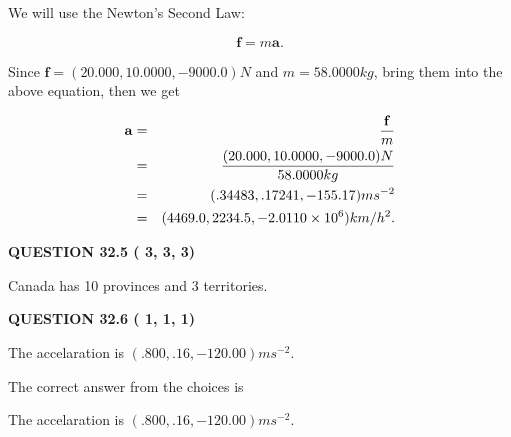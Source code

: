 \documentclass[12pt]{article}
\begin{document}
We will use the Newton's Second Law:
 
\[
\mathbf{f}=m\mathbf{a}.
\]
 
Since $\mathbf{f}=( %
20.000,  %
10.0000,  %
-9000.0 )N$
and $m= %
58.0000kg$, bring them into the above equation, then we get
 
\begin{eqnarray*}
\mathbf{a}&=&\frac{\mathbf{f}}m  \\
&=&\frac{(
20.000 ,
10.0000 ,
-9000.0 )N
}{ %
58.0000 kg}  \\
&=&(
.34483 ,
.17241,
-155.17
)ms^{-2} \\
&=&(
4469.0 ,
2234.5 ,
-2.0110 \times 10^{6}
)km/h^2.
\end{eqnarray*}
 
 
 
  
\vspace{0.2in}
  
{\textbf{\Large{QUESTION
32.5 
 (          3,          3,          3)
}}}
  
  
 
 
\noindent{}
 
 
Canada has  %
10 provinces and  %
3 territories.
 
 
 
 
  
\vspace{0.2in}
  
{\textbf{\Large{QUESTION
32.6 
 (          1,          1,          1)
}}}
  
  


 
 
\noindent{}
 
 
The accelaration is $  %
(
.800,
.16,
-120.00)
ms^{-2} $.
 
 
 
 
 
 
\noindent{}

The correct answer from the choices is


The accelaration is $  %
(
.800,
.16,
-120.00)
ms^{-2} $.
 
 
 
 
 
\noindent{}
\end{document}
